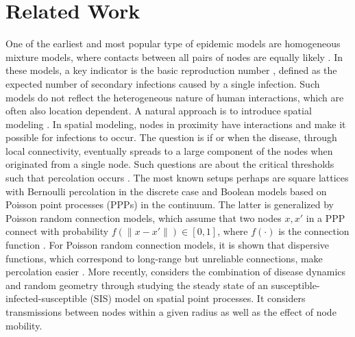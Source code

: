 \section{Related Work}
One of the earliest and most popular type of epidemic models are homogeneous mixture models, where contacts between all pairs of nodes are equally likely \cite{newman2018networks,pastor2015epidemic}. In these models, a key indicator is the basic reproduction number \cite{Delamater2019ComplexityOT}, defined as the expected number of secondary infections caused by a single infection. Such models do not reflect the heterogeneous nature of human interactions, which are often also location dependent.
A natural approach is to introduce spatial modeling \cite{Li2011TheFO,pastor2015epidemic,BARTHELEMY20111,katori2021continuum}. In spatial modeling, nodes in proximity have interactions and make it possible for infections to occur. The question is if or when the disease, through local connectivity, eventually spreads to a large component of the nodes when originated from a single node. Such questions are about the critical thresholds such that percolation occurs \cite{frisch1963percolation}.
The most known setups perhaps are square lattices with Bernoulli percolation in the discrete case and Boolean models based on Poisson point processes (PPPs) in the continuum. 
The latter is generalized by Poisson random connection models, which assume that two nodes $x,x'$ in a PPP connect with probability $f(\|x-x'\|)\in[0,1]$, where $f(\cdot)$ is the connection function \cite[Chapter 6]{MeesterRonald1996CP}. {For Poisson random connection models, it is shown that dispersive functions, which correspond to long-range but  unreliable connections, make 
percolation easier }\cite{Franceschetti05continuumpercolation,penrose1993spread}.
More recently, \cite{baccelli2020computational1} considers the combination of disease dynamics and random geometry through studying the steady state of an susceptible-infected-susceptible (SIS) model on spatial point processes. It considers transmissions between nodes within a given radius as well as the effect of node mobility.
 
 

